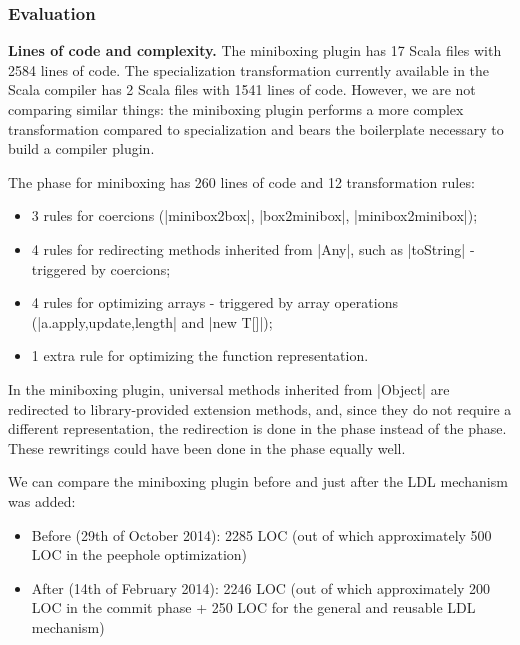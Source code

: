 \subsubsection*{Evaluation}

\textbf{Lines of code and complexity.} The miniboxing plugin has 17 Scala files with 2584 lines of code. The specialization transformation currently available in the Scala compiler \cite{iuli-thesis} has 2 Scala files with 1541 lines of code. However, we are not comparing similar things: the miniboxing plugin performs a more complex transformation compared to specialization and bears the boilerplate necessary to build a compiler plugin.

The \commit{} phase for miniboxing has 260 lines of code and 12 transformation rules:
\begin{itemize}
\item 3 rules for coercions (|minibox2box|, |box2minibox|, |minibox2minibox|);
\item 4 rules for redirecting methods inherited from |Any|, such as |toString| - triggered by coercions;
\item 4 rules for optimizing arrays - triggered by array operations (|a.{apply,update,length}| and |new T[]|);
\item 1 extra rule for optimizing the function representation.
\end{itemize}

In the miniboxing plugin, universal methods inherited from |Object| are redirected to library-provided extension methods, and, since they do not require a different representation, the redirection is done in the \commit{} phase instead of the \coerce{} phase. These rewritings could have been done in the \coerce{} phase equally well.

We can compare the miniboxing plugin before and just after the LDL mechanism was added:
\begin{itemize}
\item Before (29th of October 2014): 2285 LOC (out of which approximately 500 LOC in the peephole optimization)
\item After (14th of February 2014): 2246 LOC (out of which approximately 200 LOC in the commit phase + 250 LOC for the general and reusable LDL mechanism)
\end{itemize}


